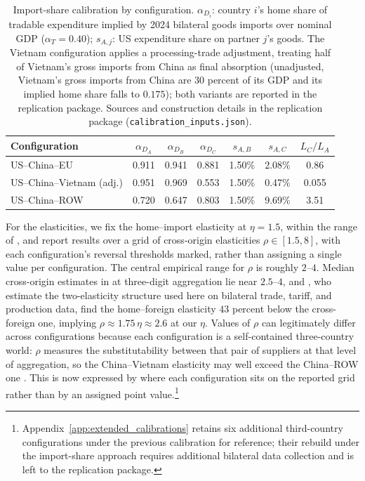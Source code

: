 \documentclass[11pt]{article}
\theoremstyle{plain}
\theoremstyle{remark}
\numberwithin{lemma}{section}
\numberwithin{proposition}{section}
\numberwithin{corollary}{section}
\newenvironment{revblock}{\par\begingroup\color{RevBlue}}{\endgroup\par}
\begin{document}
\begin{revblock}
\begin{table}[htbp]
\centering
\begin{tabular}{lcccccc}
\hline
Configuration & $\alpha_{D_A}$ & $\alpha_{D_B}$ & $\alpha_{D_C}$ & $s_{A,B}$ & $s_{A,C}$ & $L_C / L_A$ \\
\hline
US--China--EU  & 0.911 & 0.941 & 0.881 & 1.50\% & 2.08\% & 0.86 \\
US--China--Vietnam (adj.) & 0.951 & 0.969 & 0.553 & 1.50\% & 0.47\% & 0.055 \\
US--China--ROW & 0.720 & 0.647 & 0.803 & 1.50\% & 9.69\% & 3.51 \\
\hline
\end{tabular}
\caption{Import-share calibration by configuration. $\alpha_{D_i}$: country $i$'s home share of tradable expenditure implied by 2024 bilateral goods imports over nominal GDP ($\alpha_T = 0.40$); $s_{A,j}$: US expenditure share on partner $j$'s goods. The Vietnam configuration applies a processing-trade adjustment, treating half of Vietnam's gross imports from China as final absorption (unadjusted, Vietnam's gross imports from China are 30 percent of its GDP and its implied home share falls to $0.175$); both variants are reported in the replication package. Sources and construction details in the replication package (\texttt{calibration\_inputs.json}).}
\label{tab:calibration}
\end{table}

For the elasticities, we fix the home--import elasticity at $\eta = 1.5$, within the range of \cite{feenstra2018}, and report results over a grid of cross-origin elasticities $\rho \in [1.5, 8]$, with each configuration's reversal thresholds marked, rather than assigning a single value per configuration. The central empirical range for $\rho$ is roughly $2$--$4$. Median cross-origin estimates in \cite{broda2006} at three-digit aggregation lie near $2.5$--$4$, and \cite{liqiu2022}, who estimate the two-elasticity structure used here on bilateral trade, tariff, and production data, find the home--foreign elasticity $43$ percent below the cross-foreign one, implying $\rho \approx 1.75\,\eta \approx 2.6$ at our $\eta$. Values of $\rho$ can legitimately differ across configurations because each configuration is a self-contained three-country world: $\rho$ measures the substitutability between that pair of suppliers at that level of aggregation, so the China--Vietnam elasticity may well exceed the China--ROW one \citep{fajgelbaum2024trade, fajgelbaum2020return}. This is now expressed by where each configuration sits on the reported grid rather than by an assigned point value.\footnote{Appendix~\ref{app:extended_calibrations} retains six additional third-country configurations under the previous calibration for reference; their rebuild under the import-share approach requires additional bilateral data collection and is left to the replication package.}
\end{revblock}
\end{document}
